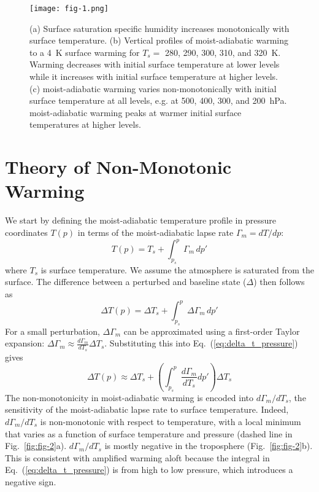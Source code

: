 \documentclass[draft]{ametsocV6.1}
\begin{document}
\begin{figure}[htbp]
 \centering
 \texttt{[image: fig-1.png]}\\
\caption{(a) Surface saturation specific humidity increases monotonically with surface temperature. (b) Vertical profiles of moist-adiabatic warming to a 4~K surface warming for $T_s = $ 280, 290, 300, 310, and 320~K. Warming decreases with initial surface temperature at lower levels while it increases with initial surface temperature at higher levels. (c) moist-adiabatic warming varies non-monotonically with initial surface temperature at all levels, e.g. at 500, 400, 300, and 200~hPa. moist-adiabatic warming peaks at warmer initial surface temperatures at higher levels.}
\label{fig:fig-1}
\end{figure}

\section{Theory of Non-Monotonic Warming}
We start by defining the moist-adiabatic temperature profile in pressure coordinates $T(p)$ in terms of the moist-adiabatic lapse rate $\Gamma_m = dT/dp$:
\begin{equation}
T(p) = T_s + \int_{p_s}^{p} \Gamma_m \, dp' \label{eq:temp_profile_pressure}
\end{equation}
where $T_s$ is surface temperature. We assume the atmosphere is saturated from the surface. The difference between a perturbed and baseline state ($\Delta$) then follows as
\begin{equation}
\Delta T(p) = \Delta T_s + \int_{p_s}^{p} \Delta\Gamma_m \, dp' \label{eq:delta_t_pressure}
\end{equation}
For a small perturbation, $\Delta \Gamma_m$ can be approximated using a first-order Taylor expansion: $\Delta\Gamma_m \approx \frac{d\Gamma_m}{dT_s}\Delta T_s$. Substituting this into Eq.~(\ref{eq:delta_t_pressure}) gives
\begin{equation}
\Delta T(p) \approx \Delta T_s + \left(\int_{p_s}^{p} \frac{d\Gamma_m}{dT_s}dp'\right)\Delta T_s \label{eq:delta_t_taylor_pressure}
\end{equation}
The non-monotonicity in moist-adiabatic warming is encoded into $d\Gamma_m/dT_s$, the sensitivity of the moist-adiabatic lapse rate to surface temperature. Indeed, $d\Gamma_m/dT_s$ is non-monotonic with respect to temperature, with a local minimum that varies as a function of surface temperature and pressure (dashed line in Fig.~\ref{fig:fig-2}a). $d\Gamma_m/dT_s$ is mostly negative in the troposphere (Fig.~\ref{fig:fig-2}b). This is consistent with amplified warming aloft because the integral in Eq.~(\ref{eq:delta_t_pressure}) is from high to low pressure, which introduces a negative sign.
\end{document}
